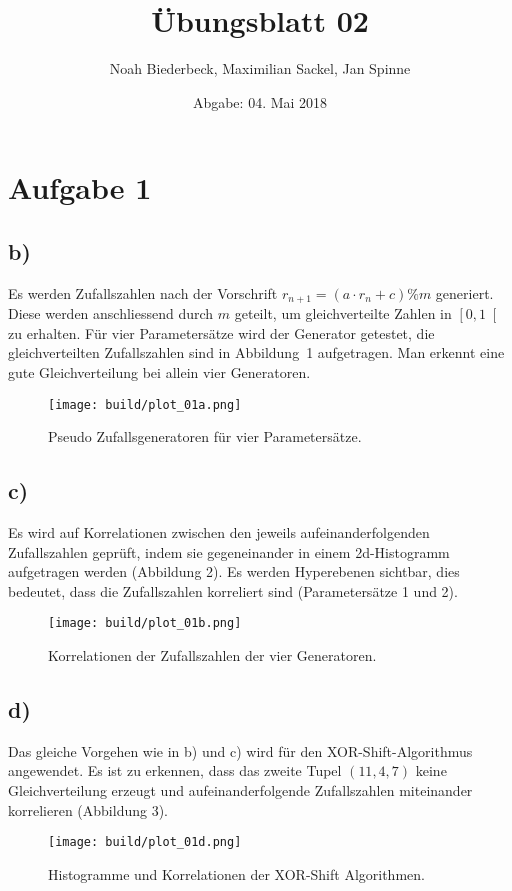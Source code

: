 \documentclass{scrartcl}
\title{Übungsblatt 02}
\author{%
  Noah Biederbeck, Maximilian Sackel, Jan Spinne
}
\date{Abgabe: 04. Mai 2018}
\begin{document}
\maketitle

\section*{Aufgabe 1}
\subsection*{b)}
Es werden Zufallszahlen nach der Vorschrift $r_{n+1} = (a \cdot r_n + c)\% m$ generiert.
Diese werden anschliessend durch $m$ geteilt, um gleichverteilte Zahlen in $\left[0, 1\right[$ zu erhalten.
Für vier Parametersätze wird der Generator getestet, die gleichverteilten Zufallszahlen sind in Abbildung~1 aufgetragen.
Man erkennt eine gute Gleichverteilung bei allein vier Generatoren.
\begin{figure}[ht]
  \centering
  \texttt{[image: build/plot\_01a.png]}
  \caption{Pseudo Zufallsgeneratoren für vier Parametersätze.}%
  \label{fig:1}
\end{figure}

\subsection*{c)}
Es wird auf Korrelationen zwischen den jeweils aufeinanderfolgenden Zufallszahlen geprüft, indem sie gegeneinander in einem 2d-Histogramm aufgetragen werden (Abbildung 2).
Es werden Hyperebenen sichtbar, dies bedeutet, dass die Zufallszahlen korreliert sind (Parametersätze 1 und 2).
\begin{figure}[ht]
  \centering
  \texttt{[image: build/plot\_01b.png]}
  \caption{Korrelationen der Zufallszahlen der vier Generatoren.}%
  \label{fig:2}
\end{figure}

\subsection*{d)}
Das gleiche Vorgehen wie in b) und c) wird für den XOR-Shift-Algorithmus angewendet.
Es ist zu erkennen, dass das zweite Tupel $(11, 4, 7)$ keine Gleichverteilung erzeugt und aufeinanderfolgende Zufallszahlen miteinander korrelieren (Abbildung 3).
\begin{figure}[ht]
  \centering
  \texttt{[image: build/plot\_01d.png]}
  \caption{Histogramme und Korrelationen der XOR-Shift Algorithmen.}%
  \label{fig:3}
\end{figure}
\end{document}
